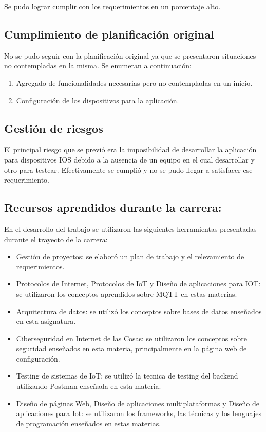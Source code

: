 Se pudo lograr cumplir con los requerimientos en un porcentaje alto. 

\subsection{Cumplimiento de planificación original}

No se pudo seguir con la planificación original ya que se presentaron situaciones no contempladas en la misma. Se enumeran a continuación:
\begin{enumerate}
\item Agregado de funcionalidades necesarias pero no contempladas en un inicio.
\item Configuración de los dispositivos para la aplicación.

\end{enumerate}


\subsection{Gestión de riesgos}

El principal riesgo que se previó era la imposibilidad de desarrollar la aplicación para dispositivos IOS debido a la ausencia de un equipo en el cual desarrollar y otro para testear. Efectivamente se cumplió y no se pudo llegar a satisfacer ese requerimiento.

\subsection{Recursos aprendidos durante la carrera:}
En el desarrollo del trabajo se utilizaron las siguientes herramientas presentadas durante el trayecto de la carrera:

\begin{itemize}
\item Gestión de proyectos: se elaboró un plan de trabajo y el relevamiento de requerimientos.
\item Protocolos de Internet, Protocolos de IoT y Diseño de aplicaciones para IOT: se utilizaron los conceptos aprendidos sobre MQTT en estas materias.
\item Arquitectura de datos: se utilizó los conceptos sobre bases de datos enseñados en esta asignatura.
\item Ciberseguridad en Internet de las Cosas: se utilizaron los conceptos sobre seguridad enseñados en esta materia, principalmente en la página web de configuración.
\item Testing de sistemas de IoT: se utilizó la tecnica de testing del backend utilizando Postman enseñada en esta materia.
\item Diseño de páginas Web, Diseño de aplicaciones multiplataformas y Diseño de aplicaciones para Iot: se utilizaron los frameworks, las técnicas y los lenguajes de programación enseñados en estas materias.
\end{itemize}

